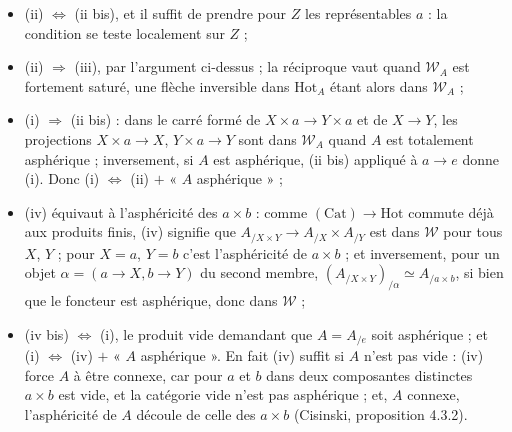 \documentclass[11pt,a4paper]{article}
\begin{document}
\begin{itemize}
\item (ii) $\Leftrightarrow$ (ii bis), et il suffit de prendre pour $Z$ les
représentables $a$ : la condition se teste localement sur $Z$ ;
\item (ii) $\Rightarrow$ (iii), par l'argument ci-dessus ; la réciproque vaut
quand $\mathcal{W}_{A}$ est fortement saturé, une flèche inversible dans
$\mathrm{Hot}_{A}$ étant alors dans $\mathcal{W}_{A}$ ;
\item (i) $\Rightarrow$ (ii bis) : dans le carré formé de
$X \times a \to Y \times a$ et de $X \to Y$, les projections
$X \times a \to X$, $Y \times a \to Y$ sont dans $\mathcal{W}_{A}$ quand $A$
est totalement asphérique ; inversement, si $A$ est asphérique, (ii bis)
appliqué à $a \to e$ donne (i). Donc (i) $\Leftrightarrow$ (ii) $+$ « $A$
asphérique » ;
\item (iv) équivaut à l'asphéricité des $a \times b$ : comme
$(\mathrm{Cat}) \to \mathrm{Hot}$ commute déjà aux produits finis, (iv)
signifie que $A_{/X \times Y} \to A_{/X} \times A_{/Y}$ est dans $\mathcal{W}$
pour tous $X$, $Y$ ; pour $X = a$, $Y = b$ c'est l'asphéricité de $a \times b$ ;
et inversement, pour un objet $\alpha = (a \to X, b \to Y)$ du second membre,
$(A_{/X \times Y})_{/\alpha} \simeq A_{/a \times b}$, si bien que le foncteur
est asphérique, donc dans $\mathcal{W}$ ;
\item (iv bis) $\Leftrightarrow$ (i), le produit vide demandant que $A = A_{/e}$ soit asphérique ; et (i) $\Leftrightarrow$ (iv) $+$ « $A$ asphérique ». En fait (iv) suffit si $A$ n'est pas vide : (iv) force $A$ à être connexe, car pour $a$ et $b$ dans deux composantes distinctes $a \times b$ est vide, et la catégorie vide n'est pas asphérique ; et, $A$ connexe, l'asphéricité de $A$ découle de celle des $a \times b$ (Cisinski, proposition 4.3.2).
\end{itemize}
\end{document}
